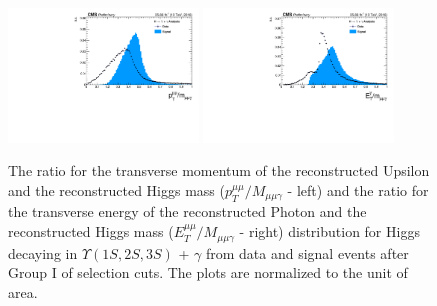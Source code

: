 \begin{figure}[!htbp]
\begin{center}
\includegraphics[width=0.45\textwidth]{figures/outputPlots/HtoUpsilon_Cat0_ZZZZZ/au/data_x_mc/noKinCuts/h_noKin_upsilonPt_over_zMass}\hspace*{1.cm}
\includegraphics[width=0.45\textwidth]{figures/outputPlots/HtoUpsilon_Cat0_ZZZZZ/au/data_x_mc/noKinCuts/h_noKin_photonPt_over_zMass}
\end{center}\vspace*{-.5cm}
\caption{The ratio for the transverse momentum of the reconstructed Upsilon and the reconstructed Higgs mass ($p_{T}^{\mu\mu}/M_{\mu\mu\gamma}$ - left) and the ratio for the transverse energy of the reconstructed Photon and the reconstructed Higgs mass ($E_{T}^{\mu\mu}/M_{\mu\mu\gamma}$ - right) distribution for Higgs decaying in $\Upsilon(1S,2S,3S)$ + $\gamma$ from data and signal events after Group I of selection cuts. The plots are normalized to the unit of area.}
\label{fig:energy_ration_HtoUpsilon_Cat0}
\end{figure}

